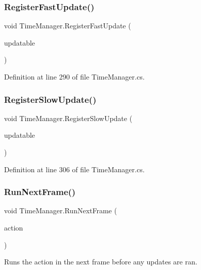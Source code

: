 \subsubsection{\texorpdfstring{Register\+Fast\+Update()}{RegisterFastUpdate()}}
{\footnotesize\ttfamily void Time\+Manager.\+Register\+Fast\+Update (\begin{DoxyParamCaption}\item[{\hyperlink{interface_i_updatable}{I\+Updatable}}]{updatable }\end{DoxyParamCaption})}



Definition at line 290 of file Time\+Manager.\+cs.

\mbox{\label{class_time_manager_a8220eefffab92503ad9f635419f00152}} 
\subsubsection{\texorpdfstring{Register\+Slow\+Update()}{RegisterSlowUpdate()}}
{\footnotesize\ttfamily void Time\+Manager.\+Register\+Slow\+Update (\begin{DoxyParamCaption}\item[{\hyperlink{interface_i_updatable}{I\+Updatable}}]{updatable }\end{DoxyParamCaption})}



Definition at line 306 of file Time\+Manager.\+cs.

\mbox{\label{class_time_manager_a74ea70f67b4faec30bad59668dd0fb1e}} 
\subsubsection{\texorpdfstring{Run\+Next\+Frame()}{RunNextFrame()}}
{\footnotesize\ttfamily void Time\+Manager.\+Run\+Next\+Frame (\begin{DoxyParamCaption}\item[{Action}]{action }\end{DoxyParamCaption})}



Runs the action in the next frame before any updates are ran. 



